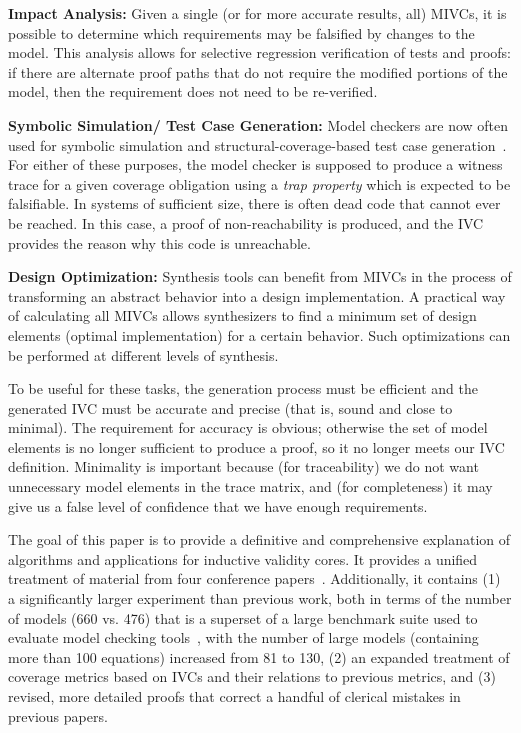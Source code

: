\noindent \textbf{Impact Analysis:} Given a single (or for more accurate results, all) MIVCs, it is possible to determine which requirements may be falsified by changes to the model.  This analysis allows for selective regression verification of tests and proofs: if there are alternate proof paths that do not require the modified portions of the model, then the requirement does not need to be re-verified.

\noindent \textbf{Symbolic Simulation/ Test Case Generation:} Model checkers are now often used for symbolic simulation and structural-coverage-based test case generation~\cite{SimulinkDesignVerifier,Whalen13:OMCDC}.  For either of these purposes, the model checker is supposed to produce a witness trace for a given coverage obligation using a {\em trap property} which is expected to be falsifiable.  In systems of sufficient size, there is often dead code that cannot ever be reached.  In this case, a proof of non-reachability is produced, and the IVC provides the reason why this code is unreachable.

\noindent \textbf{Design Optimization:} Synthesis tools can benefit from MIVCs in the process of transforming an abstract behavior into a design implementation. A practical way of calculating all MIVCs allows synthesizers to find a minimum set of design elements (optimal implementation) for a certain behavior. Such optimizations can be performed at different levels of synthesis.

To be useful for these tasks, the generation process must be efficient and the generated IVC must be accurate and precise (that is, sound and close to minimal).  The requirement for accuracy is obvious; otherwise the set of model elements is no longer sufficient to produce a proof, so it no longer meets our IVC definition.  Minimality is important because (for traceability) we do not want unnecessary model elements in the trace matrix, and (for completeness) it may give us a false level of confidence that we have enough requirements.

The goal of this paper is to provide a definitive and comprehensive explanation of algorithms and applications for inductive validity cores.  It provides a unified treatment of material from four conference papers~\cite{Ghass16,Murugesan16:renext,Ghass17Cov,Ghass17AllIVCs}.  Additionally, it contains (1) a significantly larger experiment than previous work, both in terms of the number of models (660 vs. 476) that is a superset of a large benchmark suite used to evaluate model checking tools~\cite{piskac2016}, with the number of large models (containing more than 100 equations) increased from 81 to 130, (2) an expanded treatment of coverage metrics based on IVCs and their relations to previous metrics,
 and (3) revised, more detailed proofs that correct a handful of clerical mistakes in previous papers.


